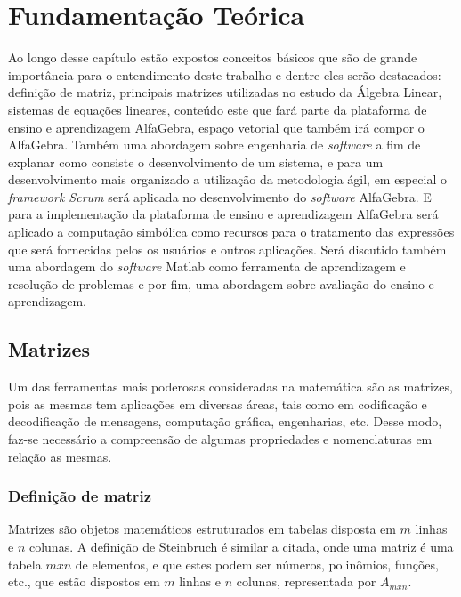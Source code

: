 \chapter{Fundamentação Teórica}
\label{cap:teoria}

\noindent Ao longo desse capítulo estão expostos conceitos básicos que são de grande importância para o entendimento deste trabalho e dentre eles serão destacados: definição de matriz, principais matrizes utilizadas no estudo da Álgebra Linear, sistemas de equações lineares, conteúdo este que fará parte da plataforma de ensino e aprendizagem AlfaGebra, espaço vetorial que também irá compor o AlfaGebra. Também uma abordagem sobre engenharia de \textit{software} a fim de explanar como consiste o desenvolvimento de um sistema, e para um desenvolvimento mais organizado a utilização da metodologia ágil, em especial o \textit{framework Scrum} será aplicada no desenvolvimento do \textit{software} AlfaGebra. E para a implementação da plataforma de ensino e aprendizagem AlfaGebra será aplicado a computação simbólica como recursos para o tratamento das expressões que será fornecidas pelos os usuários e outros aplicações. Será discutido também uma abordagem do \textit{software} Matlab como ferramenta de aprendizagem e resolução de problemas e por fim, uma abordagem sobre avaliação do ensino e aprendizagem.

\section{Matrizes}
\noindent Um das ferramentas mais poderosas consideradas na matemática são as matrizes, pois as mesmas tem aplicações em diversas áreas, tais como em codificação e decodificação de mensagens, computação gráfica, engenharias, etc. Desse modo, faz-se necessário a compreensão de algumas propriedades e nomenclaturas em relação as mesmas.

\subsection{Definição de matriz}
\noindent Matrizes são objetos matemáticos estruturados em tabelas disposta em $m$ linhas e $n$ colunas. A definição de Steinbruch \cite{1987:Steinbruch} é similar a citada, onde uma matriz é uma tabela $m x n$ de elementos, e que estes podem ser números, polinômios, funções, etc., que estão dispostos em $m$ linhas e $n$ colunas, representada por  $A{}_{mxn}$.\\

